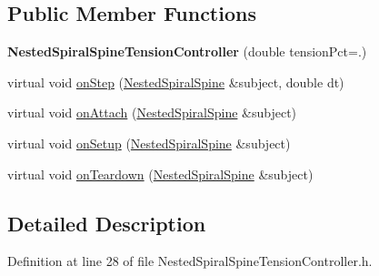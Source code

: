 \subsection*{Public Member Functions}
\begin{DoxyCompactItemize}
\item 
\hypertarget{class_nested_spiral_spine_tension_controller_aaeb1dc3e61edb56282287f4d21f9de40}{{\bfseries Nested\-Spiral\-Spine\-Tension\-Controller} (double tension\-Pct=.)}\label{class_nested_spiral_spine_tension_controller_aaeb1dc3e61edb56282287f4d21f9de40}

\item 
virtual void \hyperlink{class_nested_spiral_spine_tension_controller_a43fd037dbf2f7391cea57ec6386d77b1}{on\-Step} (\hyperlink{class_nested_spiral_spine}{Nested\-Spiral\-Spine} \&subject, double dt)
\item 
virtual void \hyperlink{classtg_observer_a0ecd07483eb41f9a0ab19b8ed24052f1}{on\-Attach} (\hyperlink{class_nested_spiral_spine}{Nested\-Spiral\-Spine} \&subject)
\item 
virtual void \hyperlink{classtg_observer_ae7b2de87bd4a6e786bc16f1b801c36a6}{on\-Setup} (\hyperlink{class_nested_spiral_spine}{Nested\-Spiral\-Spine} \&subject)
\item 
virtual void \hyperlink{classtg_observer_a1663edb3732e5ffb7bbe6bfb4ade88b8}{on\-Teardown} (\hyperlink{class_nested_spiral_spine}{Nested\-Spiral\-Spine} \&subject)
\end{DoxyCompactItemize}


\subsection{Detailed Description}


Definition at line 28 of file Nested\-Spiral\-Spine\-Tension\-Controller.\-h.



